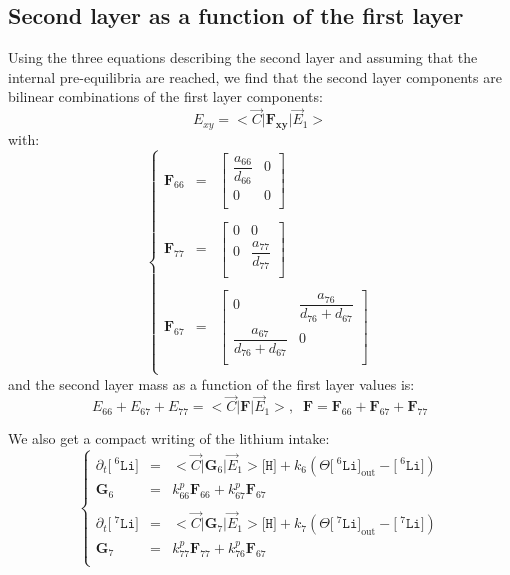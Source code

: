 \documentclass[aps,onecolumn,11pt]{revtex4}
\newcommand{\mychem}[1]{\mathtt{#1}}
\newcommand{\myconc}[1]{\big[#1\big]}
\newcommand{\spLi}[1]{{\!~^{#1}\mychem{Li}}}
\newcommand{\Li}[1]{\myconc{\spLi{#1}}}
\newcommand{\spproton}{\mychem{H}}
\newcommand{\proton}{\myconc{\spproton}}
\newcommand{\myout}[1]{{#1}_{\mathrm{out}}}
\newcommand{\LiOut}[1]{\myout{\Li{#1}}}
\newcommand{\mymat}[1]{{\bm{#1}}}
\begin{document}
\subsection{Second layer as a function of the first layer}

Using the three equations describing the second layer and assuming that the internal pre-equilibria are reached, we find
that the second layer components are bilinear combinations of the first layer components:
\begin{equation}
\boxed{
E_{xy} = <{\vec{C}} \vert \mymat{F_{xy}} \vert \vec{E}_1 > 
}
\end{equation}
with:
\begin{equation}
\left\lbrace
\begin{array}{rcl}
\mymat{F}_{66} & = & 
\begin{bmatrix}
	\dfrac{a_{66}}{d_{66} } & 0 \\
	0 & 0\\
\end{bmatrix} \\
\\
\mymat{F}_{77} & = & 
\begin{bmatrix}
	0 & 0 \\
	0 & \dfrac{a_{77}}{d_{77} }\\
\end{bmatrix}  \\
\\
\mymat{F}_{67} & = & 
\begin{bmatrix}
	0 &\dfrac{a_{76}}{d_{76}+d_{67}}\\
	\dfrac{a_{67}}{d_{76}+d_{67}} & 0\\
\end{bmatrix} \\
\end{array}
\right.
\end{equation}
and the second layer mass as a function of the first layer values is:
\begin{equation}
E_{66} + E_{67} + E_{77} = <{\vec{C}} \vert \mymat{F} \vert \vec{E}_1 >, \;\;
 \mymat{F} 
 =  \mymat{F}_{66} + \mymat{F}_{67}  + \mymat{F}_{77}
\end{equation}

We also get a compact writing of the lithium intake:
\begin{equation}
\left\lbrace
\begin{array}{rcl}
	\partial_t \Li{6} & = & <\vec{C}|\mymat{G}_6|\vec{E}_1> \proton+ k_6\left(\Theta \LiOut{6} - \Li{6}\right)\\
	\mymat{G}_6 &= & k^p_{66} \mymat{F}_{66} + k^p_{67}\mymat{F}_{67}	\\
	\\
	\partial_t \Li{7} & = & <\vec{C}|\mymat{G}_7|\vec{E}_1> \proton + k_7\left(\Theta \LiOut{7} - \Li{7}\right)\\
	\mymat{G}_7 & = & k^p_{77} \mymat{F}_{77} + k^p_{76}\mymat{F}_{67} \\
\end{array}
\right.
\end{equation}
\end{document}
